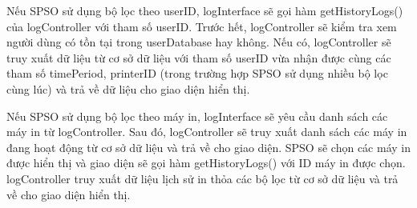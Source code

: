 Nếu SPSO sử dụng bộ lọc theo userID, logInterface sẽ gọi hàm getHistoryLogs() của logController với tham số userID. Trước hết, logController sẽ kiểm tra xem người dùng có tồn tại trong userDatabase hay không. Nếu có, logController sẽ truy xuất dữ liệu từ cơ sở dữ liệu với tham số userID vừa nhận được cùng các tham số timePeriod, printerID (trong trường hợp SPSO sử dụng nhiều bộ lọc cùng lúc) và trả về dữ liệu cho giao diện hiển thị.\par

Nếu SPSO sử dụng bộ lọc theo máy in, logInterface sẽ yêu cầu danh sách các máy in từ logController. Sau đó, logController sẽ truy xuất danh sách các máy in đang hoạt động từ cơ sở dữ liệu và trả về cho giao diện. SPSO sẽ chọn các máy in được hiển thị và giao diện sẽ gọi hàm getHistoryLogs() với ID máy in được chọn. logController truy xuất dữ liệu lịch sử in thỏa các bộ lọc từ cơ sở dữ liệu và trả về cho giao diện hiển thị.\par